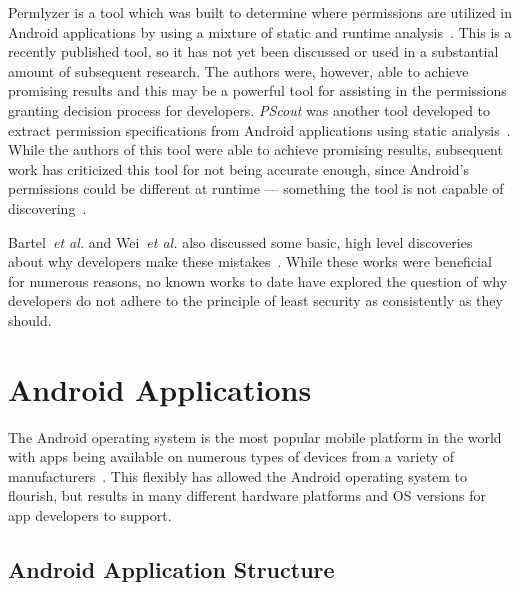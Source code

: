 \documentclass[conference]{IEEEtran}
\begin{document}
Permlyzer is a tool which was built to determine where permissions are utilized in Android applications by using a mixture of static and runtime analysis~\cite{6698893}. This is a recently published tool, so it has not yet been discussed or used in a substantial amount of subsequent research. The authors were, however, able to achieve promising results and this may be a powerful tool for assisting in the permissions granting decision process for developers. \emph{PScout} was another tool developed to extract permission specifications from Android applications using static analysis~\cite{Au:2012:PAA:2382196.2382222}. While the authors of this tool were able to achieve promising results, subsequent work has criticized this tool for not being accurate enough, since Android's permissions could be different at runtime --- something the tool is not capable of discovering~\cite{zhang2013vetting}.

Bartel~\emph{et al.} and Wei~\emph{et al.} also discussed some basic, high level discoveries about why developers make these mistakes~\cite{Bartel:2012:ASP:2351676.2351722,Wei:2012:PEA:2420950.2420956}. While these works were beneficial for numerous reasons, no known works to date have explored the question of why developers do not adhere to the principle of least security as consistently as they should.






\label{sec: androidapplications}
\section{Android Applications}


The Android operating system is the most popular mobile platform in the world with apps being available on numerous types of devices from a variety of manufacturers~\cite{androidpopularity_url}. This flexibly has allowed the Android operating system to flourish, but results in many different hardware platforms and OS versions for app developers to support.

\subsection{Android Application Structure}
\end{document}
